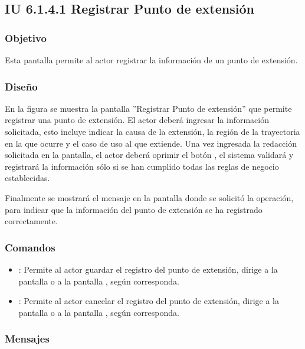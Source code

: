 \subsection{IU 6.1.4.1 Registrar Punto de extensión}

\subsubsection{Objetivo}
	Esta pantalla permite al actor registrar la información de un punto de extensión.
\subsubsection{Diseño}
	En la figura  se muestra la pantalla ''Registrar Punto de extensión'' que permite registrar una punto de extensión. El actor deberá ingresar la información solicitada, esto incluye indicar la causa de la extensión, la región de la trayectoria en la que ocurre y el caso de uso al que extiende.
	Una vez ingresada la redacción solicitada en la pantalla, el actor deberá oprimir el botón , el sistema validará y registrará la información sólo si se han cumplido todas las reglas de negocio establecidas.
	
	Finalmente se mostrará el mensaje  en la pantalla donde se solicitó la operación, para indicar que la información del punto de extensión se ha registrado correctamente.

\subsubsection{Comandos}
\begin{itemize}
	\item {}: Permite al actor guardar el registro del punto de extensión, dirige a la pantalla  o a la pantalla , según corresponda.
	\item {}: Permite al actor cancelar el registro del punto de extensión, dirige a la pantalla  o a la pantalla , según corresponda.
\end{itemize}

\subsubsection{Mensajes}

